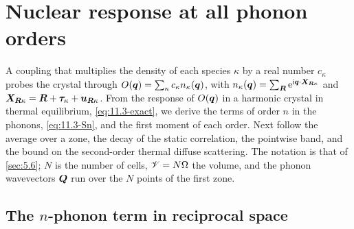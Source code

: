 \section{Nuclear response at all phonon orders}\label{app:D.31}

A coupling that multiplies the density of each species $\kappa$ by a real number $c_\kappa$ probes the crystal through $O(\bm{q}) = \sum_\kappa c_\kappa n_\kappa(\bm{q})$, with $n_\kappa(\bm{q}) = \sum_{\bm{R}}\mathrm{e}^{\mathrm{i}\bm{q}\cdot\bm{X}_{\bm{R}\kappa}}$ and $\bm{X}_{\bm{R}\kappa} = \bm{R} + \bm{\tau}_\kappa + \bm{u}_{\bm{R}\kappa}$. From the response of $O(\bm{q})$ in a harmonic crystal in thermal equilibrium, \cref{eq:11.3-exact}, we derive the terms of order $n$ in the phonons, \cref{eq:11.3-Sn}, and the first moment of each order. Next follow the average over a zone, the decay of the static correlation, the pointwise band, and the bound on the second-order thermal diffuse scattering. The notation is that of \cref{sec:5.6}; $N$ is the number of cells, $\mathscr{V} = N\Omega$ the volume, and the phonon wavevectors $\bm{Q}$ run over the $N$ points of the first zone.

\subsection{The $n$-phonon term in reciprocal space}

